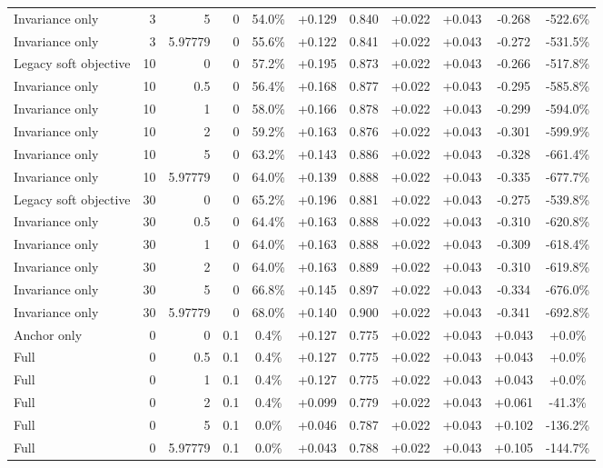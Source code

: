 \begin{table}[htbp]
\begin{tabular}{lrrrccccccc}
Invariance only & 3 & 5 & 0 & 54.0\% & +0.129 & 0.840 & +0.022 & +0.043 & -0.268 & -522.6\% \\
Invariance only & 3 & 5.97779 & 0 & 55.6\% & +0.122 & 0.841 & +0.022 & +0.043 & -0.272 & -531.5\% \\
Legacy soft objective & 10 & 0 & 0 & 57.2\% & +0.195 & 0.873 & +0.022 & +0.043 & -0.266 & -517.8\% \\
Invariance only & 10 & 0.5 & 0 & 56.4\% & +0.168 & 0.877 & +0.022 & +0.043 & -0.295 & -585.8\% \\
Invariance only & 10 & 1 & 0 & 58.0\% & +0.166 & 0.878 & +0.022 & +0.043 & -0.299 & -594.0\% \\
Invariance only & 10 & 2 & 0 & 59.2\% & +0.163 & 0.876 & +0.022 & +0.043 & -0.301 & -599.9\% \\
Invariance only & 10 & 5 & 0 & 63.2\% & +0.143 & 0.886 & +0.022 & +0.043 & -0.328 & -661.4\% \\
Invariance only & 10 & 5.97779 & 0 & 64.0\% & +0.139 & 0.888 & +0.022 & +0.043 & -0.335 & -677.7\% \\
Legacy soft objective & 30 & 0 & 0 & 65.2\% & +0.196 & 0.881 & +0.022 & +0.043 & -0.275 & -539.8\% \\
Invariance only & 30 & 0.5 & 0 & 64.4\% & +0.163 & 0.888 & +0.022 & +0.043 & -0.310 & -620.8\% \\
Invariance only & 30 & 1 & 0 & 64.0\% & +0.163 & 0.888 & +0.022 & +0.043 & -0.309 & -618.4\% \\
Invariance only & 30 & 2 & 0 & 64.0\% & +0.163 & 0.889 & +0.022 & +0.043 & -0.310 & -619.8\% \\
Invariance only & 30 & 5 & 0 & 66.8\% & +0.145 & 0.897 & +0.022 & +0.043 & -0.334 & -676.0\% \\
Invariance only & 30 & 5.97779 & 0 & 68.0\% & +0.140 & 0.900 & +0.022 & +0.043 & -0.341 & -692.8\% \\
Anchor only & 0 & 0 & 0.1 & 0.4\% & +0.127 & 0.775 & +0.022 & +0.043 & +0.043 & +0.0\% \\
Full & 0 & 0.5 & 0.1 & 0.4\% & +0.127 & 0.775 & +0.022 & +0.043 & +0.043 & +0.0\% \\
Full & 0 & 1 & 0.1 & 0.4\% & +0.127 & 0.775 & +0.022 & +0.043 & +0.043 & +0.0\% \\
Full & 0 & 2 & 0.1 & 0.4\% & +0.099 & 0.779 & +0.022 & +0.043 & +0.061 & -41.3\% \\
Full & 0 & 5 & 0.1 & 0.0\% & +0.046 & 0.787 & +0.022 & +0.043 & +0.102 & -136.2\% \\
Full & 0 & 5.97779 & 0.1 & 0.0\% & +0.043 & 0.788 & +0.022 & +0.043 & +0.105 & -144.7\% \\

\end{tabular}
\end{table}
